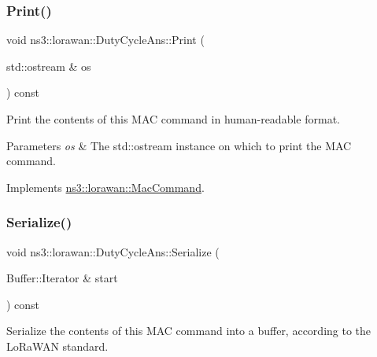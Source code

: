 \mbox{\label{classns3_1_1lorawan_1_1DutyCycleAns_a201b7cdda81f6b775f13da09ba675e26}} 
\subsubsection{\texorpdfstring{Print()}{Print()}}
{\footnotesize\ttfamily void ns3\+::lorawan\+::\+Duty\+Cycle\+Ans\+::\+Print (\begin{DoxyParamCaption}\item[{std\+::ostream \&}]{os }\end{DoxyParamCaption}) const\hspace{0.3cm}{\ttfamily [virtual]}}

Print the contents of this M\+AC command in human-\/readable format.


\begin{DoxyParams}{Parameters}
{\em os} & The std\+::ostream instance on which to print the M\+AC command. \\
\hline
\end{DoxyParams}


Implements \hyperlink{classns3_1_1lorawan_1_1MacCommand_a6bf88db38dab7dcd817811a9fb59f920}{ns3\+::lorawan\+::\+Mac\+Command}.

\mbox{\label{classns3_1_1lorawan_1_1DutyCycleAns_aff6f7b100eba491c770be23c342e5f87}} 
\subsubsection{\texorpdfstring{Serialize()}{Serialize()}}
{\footnotesize\ttfamily void ns3\+::lorawan\+::\+Duty\+Cycle\+Ans\+::\+Serialize (\begin{DoxyParamCaption}\item[{Buffer\+::\+Iterator \&}]{start }\end{DoxyParamCaption}) const\hspace{0.3cm}{\ttfamily [virtual]}}

Serialize the contents of this M\+AC command into a buffer, according to the Lo\+Ra\+W\+AN standard.


